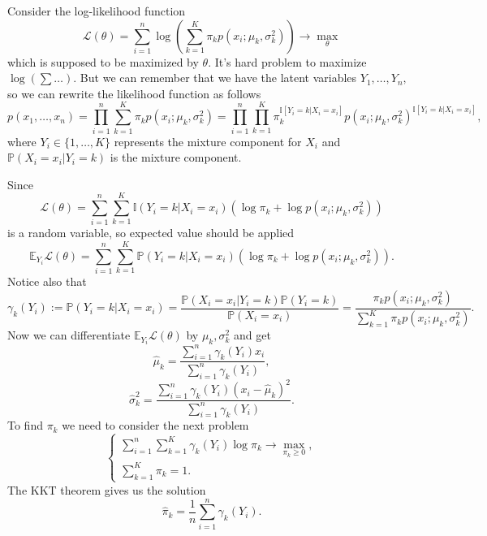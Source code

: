 \documentclass[a4paper, 12pt]{article}
\begin{document}
Consider the log-likelihood function
$$
\mathcal{L}(\theta) = \sum \limits_{i=1}^n \log \left( \sum \limits_{k=1}^K \pi_k p(x_i; \mu_k, \sigma^2_k) \right) \rightarrow \max \limits_{\theta}
$$
which is supposed to be maximized by $\theta.$
It's hard problem to maximize $\log(\sum \ldots).$ But we can remember that we have the latent variables $Y_1, \ldots, Y_n,$ so we can rewrite the likelihood function as follows
$$
p(x_1, \ldots, x_n) = \prod \limits_{i=1}^n \sum \limits_{k=1}^K \pi_k p(x_i; \mu_k, \sigma^2_k) = \prod \limits_{i=1}^n \prod \limits_{k=1}^K \pi_k^{\mathbb{I}[Y_i = k|X_i = x_i]} p(x_i; \mu_k, \sigma^2_k)^{\mathbb{I}[Y_i = k|X_i = x_i]},
$$
where $ Y_i \in \{ 1, \ldots, K \}$ represents the mixture component for $X_i$ and $\mathbb{P}(X_i = x_i|Y_i = k)$ is the mixture component.

Since 
$$
\mathcal{L}(\theta) =  \sum \limits_{i=1}^n \sum \limits_{k=1}^K \mathbb{I}(Y_i = k|X_i = x_i) (\log \pi_k + \log p(x_i; \mu_k, \sigma^2_k))
$$ 
is a random variable, so expected value should be applied
$$
\mathbb{E}_{Y_i} \mathcal{L}(\theta) =  \sum \limits_{i=1}^n \sum \limits_{k=1}^K \mathbb{P}(Y_i = k|X_i = x_i) (\log \pi_k + \log p(x_i; \mu_k, \sigma^2_k)).
$$ 
Notice also that
$$
\gamma_k(Y_i) := \mathbb{P}(Y_i = k | X_i = x_i) = \dfrac{\mathbb{P}(X_i = x_i | Y_i = k) \mathbb{P}(Y_i = k)}{\mathbb{P}(X_i = x_i)} = \dfrac{\pi_k p(x_i; \mu_k, \sigma^2_k)}{\sum \limits_{k=1}^K \pi_k p(x_i; \mu_k, \sigma^2_k)}.
$$
Now we can differentiate $\mathbb{E}_{Y_i} \mathcal{L}(\theta)$ by $\mu_k, \sigma_k^2$ and get 
$$
\hat{\mu}_k = \dfrac{\sum \limits_{i=1}^n \gamma_k(Y_i) x_i}{\sum \limits_{i=1}^n \gamma_k(Y_i)},
$$
$$
\hat{\sigma}_k^2 = \dfrac{\sum \limits_{i=1}^n \gamma_k(Y_i) (x_i - \hat{\mu}_k)^2}{\sum \limits_{i=1}^n \gamma_k(Y_i)}.
$$
To find $\pi_k$ we need to consider the next problem
$$
\begin{cases}
\sum \limits_{i=1}^n \sum \limits_{k=1}^K \gamma_k(Y_i) \log \pi_k \rightarrow \max \limits_{\pi_k \geqslant 0}, \\
\sum \limits_{k=1}^K \pi_k = 1.
\end{cases}
$$
The KKT theorem gives us the solution
$$
\hat{\pi}_k = \dfrac{1}{n} \sum \limits_{i=1}^n \gamma_k(Y_i).
$$
\end{document}
